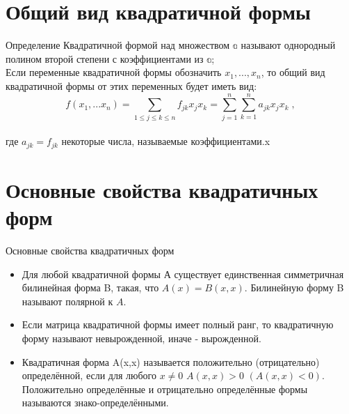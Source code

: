 \documentclass[10pt,pdf,hyperref={unicode}]{beamer}
\begin{document}
\section{Общий вид квадратичной формы}
\begin{frame}

\begin{block}{Определение}
Квадратичной формой над множеством $\mathds{a}$ называют однородный полином второй степени с коэффициентами из $\mathds{a}$;
\\
Если переменные квадратичной формы обозначить $x_1,...,x_n$, то общий вид квадратичной формы от этих переменных будет иметь вид:
\\
$$f(x_1,...x_n)=\sum_{1 \le j \le k \le n}{f_{jk}x_jx_k} = \sum_{j=1}^{n}{}\sum_{k=1}^{n}{a_{jk}x_{j}x_{k}} \;,$$
\\ где $a_{jk} = f_{jk}$ некоторые числа, называемые коэффициентами.x
\end{block}

\end{frame}


\section{Основные свойства квадратичных форм}

\begin{frame}{Основные свойства квадратичных форм}

\begin{block}

\begin{itemize}
\item{Для любой квадратичной формы $А$ существует единственная симметричная билинейная форма B, такая, что $A(x) = B(x, x)$. Билинейную форму B называют полярной к $A$.}
\item{Если матрица квадратичной формы имеет полный ранг, то квадратичную форму называют невырожденной, иначе - вырожденной.}
\item{Квадратичная форма A(x,x) называется положительно (отрицательно) определённой, если для любого $x \ne 0$ $A(x,x)> 0$ $(A(x,x)<0)$. Положительно определённые и отрицательно определённые формы называются знако-определёнными.}

\end{itemize}

\end{block}

\end{frame}
\end{document}
